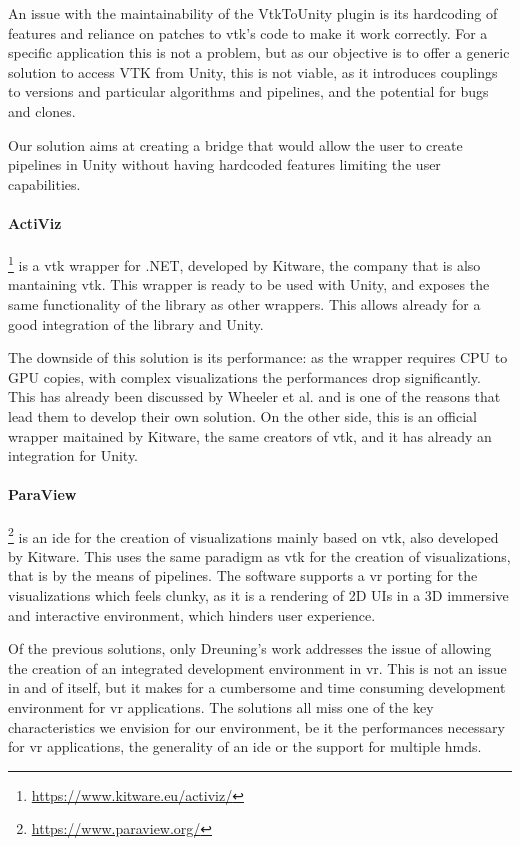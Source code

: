 An issue with the maintainability of the VtkToUnity plugin is its hardcoding of features and reliance on patches to \acrshort{vtk}'s code to make it work correctly. For a specific application this is not a problem, but as our objective is to offer a generic solution to access VTK from Unity, this is not viable, as it introduces couplings to versions and particular algorithms and pipelines, and the potential for bugs and clones.

Our solution aims at creating a bridge that would allow the user to create pipelines in Unity without having hardcoded features limiting the user capabilities.

\paragraph{ActiViz}\footnote{\url{https://www.kitware.eu/activiz/}} is a \acrshort{vtk} wrapper for .NET, developed by Kitware, the company that is also mantaining \acrshort{vtk}. This wrapper is ready to be used with Unity, and exposes the same functionality of the library as other wrappers. This allows already for a good integration of the library and Unity.

The downside of this solution is its performance: as the wrapper requires CPU to GPU copies, with complex visualizations the performances drop significantly. This has already been discussed by Wheeler et al. \cite{wheeler_virtual_2018} and is one of the reasons that lead them to develop their own solution. On the other side, this is an official wrapper maitained by Kitware, the same creators of \acrshort{vtk}, and it has already an integration for Unity.

\paragraph{ParaView} \footnote{\url{https://www.paraview.org/}} is an \acrshort{ide} for the creation of visualizations mainly based on \acrshort{vtk}, also developed by Kitware. This uses the same paradigm as \acrshort{vtk} for the creation of visualizations, that is by the means of pipelines. The software supports a \acrshort{vr} porting for the visualizations which feels clunky, as it is a rendering of 2D UIs in a 3D immersive and interactive environment, which hinders user experience.

Of the previous solutions, only Dreuning's work addresses the issue of allowing the creation of an integrated development environment in \acrshort{vr}. This is not an issue in and of itself, but it makes for a cumbersome and time consuming development environment for \acrshort{vr} applications. The solutions all miss one of the key characteristics we envision for our environment, be it the performances necessary for \acrshort{vr} applications, the generality of an \acrshort{ide} or the support for multiple \acrshort{hmd}s.